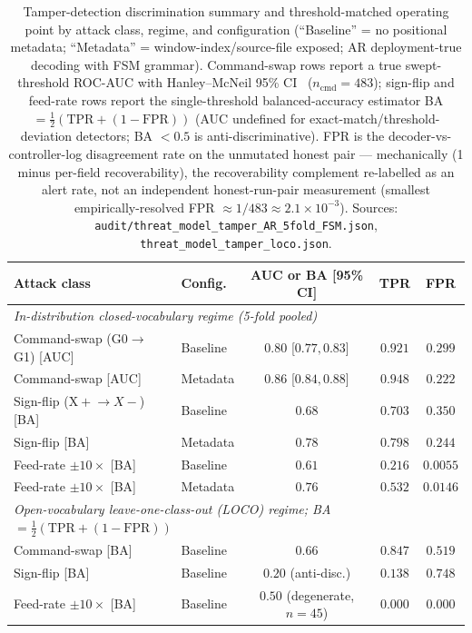 \documentclass[sensors,article,submit,moreauthors,pdftex]{Definitions/mdpi}
\begin{document}
\begin{table}[!htbp]
\centering
\caption{Tamper-detection discrimination summary and threshold-matched operating point by attack class, regime, and configuration (``Baseline'' = no positional metadata; ``Metadata'' = window-index/source-file exposed; AR deployment-true decoding with FSM grammar). Command-swap rows report a true swept-threshold ROC-AUC with Hanley--McNeil 95\% CI~\cite{hanley1982meaning} ($n_{\text{cmd}}\!=\!483$); sign-flip and feed-rate rows report the single-threshold balanced-accuracy estimator BA$=\!\tfrac{1}{2}(\mathrm{TPR}+(1-\mathrm{FPR}))$ (AUC undefined for exact-match/threshold-deviation detectors; BA $<\!0.5$ is anti-discriminative). FPR is the decoder-vs-controller-log disagreement rate on the unmutated honest pair --- mechanically (1 minus per-field recoverability), the recoverability complement re-labelled as an alert rate, not an independent honest-run-pair measurement (smallest empirically-resolved FPR $\approx\!1/483 \approx 2.1\!\times\!10^{-3}$). Sources: \texttt{audit/threat\_model\_tamper\_AR\_5fold\_FSM.json}, \texttt{threat\_model\_tamper\_loco.json}.}
\label{tab:tamper_auc}
\footnotesize
\setlength{\tabcolsep}{4pt}
\begin{tabular}{l l c c c}
\toprule
\textbf{Attack class} & \textbf{Config.} & \textbf{AUC or BA [95\% CI]} & \textbf{TPR} & \textbf{FPR} \\
\midrule
\multicolumn{5}{l}{\emph{In-distribution closed-vocabulary regime (5-fold pooled)}} \\
Command-swap (G0$\to$G1) [AUC]   & Baseline & $0.80$ \tiny{[$0.77, 0.83$]} & $0.921$ & $0.299$ \\
Command-swap [AUC]               & Metadata  & $0.86$ \tiny{[$0.84, 0.88$]} & $0.948$ & $0.222$ \\
Sign-flip (X$\!+\!\to\!X-$) [BA] & Baseline & $0.68$ & $0.703$ & $0.350$ \\
Sign-flip [BA]                   & Metadata  & $0.78$ & $0.798$ & $0.244$ \\
Feed-rate $\pm 10\times$ [BA]    & Baseline & $0.61$ & $0.216$ & $0.0055$ \\
Feed-rate $\pm 10\times$ [BA]    & Metadata  & $0.76$ & $0.532$ & $0.0146$ \\
\midrule
\multicolumn{5}{l}{\emph{Open-vocabulary leave-one-class-out (LOCO) regime; BA$\!=\!\tfrac{1}{2}(\mathrm{TPR}+(1-\mathrm{FPR}))$}} \\
Command-swap [BA]                & Baseline & $0.66$ & $0.847$ & $0.519$ \\
Sign-flip [BA]                   & Baseline & $0.20$ \tiny{(anti-disc.)} & $0.138$ & $0.748$ \\
Feed-rate $\pm 10\times$ [BA]    & Baseline & $0.50$ \tiny{(degenerate, $n\!=\!45$)} & $0.000$ & $0.000$ \\
\bottomrule
\end{tabular}
\end{table}
\end{document}
